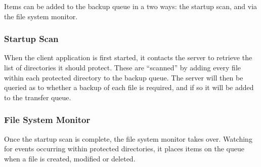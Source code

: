 Items can be added to the backup queue in a two ways: the startup scan, and via
the file system monitor.

\subsubsection{Startup Scan}

When the client application is first started, it contacts the server to
retrieve the list of directories it should protect. These are ``scanned'' by
adding every file within each protected directory to the backup queue. The
server will then be queried as to whether a backup of each file is required,
and if so it will be added to the transfer queue.

\subsubsection{File System Monitor}

Once the startup scan is complete, the file system monitor takes over. Watching
for events occurring within protected directories, it places items on the queue
when a file is created, modified or deleted.
